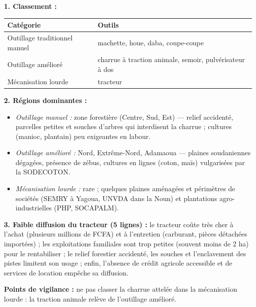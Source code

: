 \documentclass[11pt]{article}
\begin{document}
\begin{corrige}
\textbf{1. Classement :}
\begin{center}
\begin{tabularx}{\linewidth}{|l|X|}\hline
\rowcolor{popblueL} Catégorie & Outils \\ \hline
Outillage traditionnel manuel & machette, houe, daba, coupe-coupe \\ \hline
Outillage amélioré & charrue à traction animale, semoir, pulvérisateur à dos \\ \hline
Mécanisation lourde & tracteur \\ \hline
\end{tabularx}
\end{center}

\textbf{2. Régions dominantes :}
\begin{itemize}
\item \emph{Outillage manuel :} zone forestière (Centre, Sud, Est) — relief accidenté, parcelles petites et souches d'arbres qui interdisent la charrue ; cultures (manioc, plantain) peu exigeantes en labour.
\item \emph{Outillage amélioré :} Nord, Extrême-Nord, Adamaoua — plaines soudaniennes dégagées, présence de zébus, cultures en lignes (coton, maïs) vulgarisées par la SODECOTON.
\item \emph{Mécanisation lourde :} rare ; quelques plaines aménagées et périmètres de sociétés (SEMRY à Yagoua, UNVDA dans la Noun) et plantations agro-industrielles (PHP, SOCAPALM).
\end{itemize}

\textbf{3. Faible diffusion du tracteur (5 lignes) :} le tracteur coûte très cher à l'achat (plusieurs millions de FCFA) et à l'entretien (carburant, pièces détachées importées) ; les exploitations familiales sont trop petites (souvent moins de 2 ha) pour le rentabiliser ; le relief forestier accidenté, les souches et l'enclavement des pistes limitent son usage ; enfin, l'absence de crédit agricole accessible et de services de location empêche sa diffusion.

\textbf{Points de vigilance :} ne pas classer la charrue attelée dans la mécanisation lourde : la traction animale relève de l'outillage amélioré.
\end{corrige}
\end{document}
